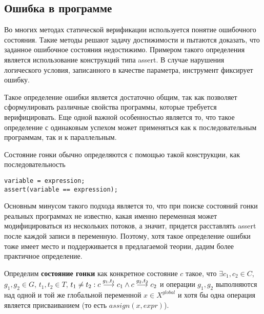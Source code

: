 

\subsection{Ошибка в программе}

Во многих методах статической верификации используется понятие ошибочного состояния. 
Такие методы решают задачу достижимости и пытаются доказать, что заданное ошибочное состояния недостижимо.
Примером такого определения является использование конструкций типа assert. 
В случае нарушения логического условия, записанного в качестве параметра, инструмент фиксирует ошибку.

Такое определение ошибки является достаточно общим, так как позволяет сформулировать различные свойства программы, которые требуется верифицировать. 
Еще одной важной особенностью является то, что такое определение с одинаковым успехом может применяться как к последовательным программам, так и к параллельным. 

Состояние гонки обычно определяются с помощью такой конструкции, как последовательность

\begin{small}
\begin{lstlisting}
variable = expression;
assert(variable == expression);
\end{lstlisting}
\end{small}

Основным минусом такого подхода является то, что при поиске состояний гонки  реальных программах не известно, какая именно переменная может модифицироваться из нескольких потоков, а значит, придется расставлять assert после каждой записи в переменную. 
Поэтому, хотя такое определение ошибки тоже имеет место и поддерживается в предлагаемой теории, дадим более практичное определение.

\begin{defn}
\label{raceDef}
Определим \textbf{состояние гонки} как конкретное состояние $c$ такое, что $\exists c_1, c_2 \in C$, $g_1, g_2 \in G$, $t_1, t_2 \in T$, $t_1 \neq t_2 : c \stackrel{g_1, t_1}{\longrightarrow} c_1 \land c \stackrel{g_2, t_2}{\longrightarrow} c_2$ и операции $g_1, g_2$ выполняются над одной и той же глобальной переменной $x \in X^{global}$ и хотя бы одна операция является присваиванием (то есть $assign(x, expr)$).
\end{defn}


